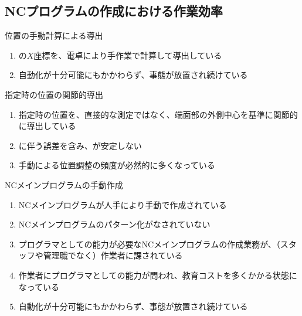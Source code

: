 \subsection{NCプログラムの作成における作業効率}

\begin{Issues}{\KeywayCenter 位置の手動計算による導出}
\begin{enumerate}[label=\sarrow]
\item[{\sarrow[red]}]\KeywayCenter の$X$座標を、電卓により手作業で計算して導出している
\item[{\sarrow[red]}]自動化が十分可能にもかかわらず、事態が放置され続けている
\end{enumerate}
\end{Issues}

\begin{Issues}{\AsideKeywayDepth 指定時の\KeywayCenter 位置の関節的導出}
\begin{enumerate}[label=\sarrow]
\item[{\sarrow[red]}]\AsideKeywayDepth 指定時の\KeywayCenter 位置を、直接的な測定ではなく、端面部の外側中心を基準に関節的に導出している
\item[{\sarrow[red]}]\CenterCurvature に伴う誤差を含み、\AsideKeywayDepth が安定しない
\item[{\sarrow[red]}]手動による位置調整の頻度が必然的に多くなっている
\end{enumerate}
\end{Issues}

\begin{Issues}{NCメインプログラムの手動作成}
\begin{enumerate}[label=\sarrow]
\item[{\sarrow[red]}]NCメインプログラムが人手により手動で作成されている
\item[{\sarrow[red]}]NCメインプログラムのパターン化がなされていない
\item[{\sarrow[red]}]プログラマとしての能力が必要なNCメインプログラムの作成業務が、（スタッフや管理職でなく）作業者に課されている
\item[{\sarrow[red]}]作業者にプログラマとしての能力が問われ、教育コストを多くかかる状態になっている
\item[{\sarrow[red]}]自動化が十分可能にもかかわらず、事態が放置され続けている
\end{enumerate}
\end{Issues}



